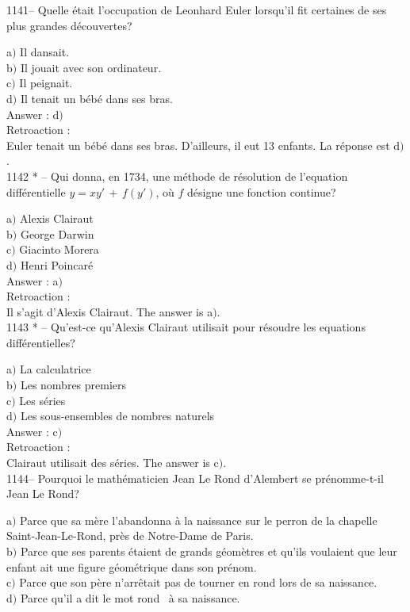 ﻿\documentclass[letterpaper, 12pt]{article}
\begin{document}
1141-- Quelle \'etait l'occupation de Leonhard Euler lorsqu'il fit
certaines de ses plus grandes d\'ecouvertes?

a$)$ Il dansait. \\
b$)$ Il jouait avec son ordinateur.  \\
c$)$ Il peignait.   \\
d$)$ Il tenait un b\'eb\'e dans ses bras.  \\

Answer : d$)$\\

Retroaction : \\
Euler tenait un b\'eb\'e dans ses bras. D'ailleurs, il eut 13 enfants. La
r\'eponse est d$)$. \\

1142 * -- Qui donna, en 1734, une m\'ethode de r\'esolution de
l'equation diff\'erentielle $y=xy'\,+\,f(y')$, o\`u $f$ d\'esigne
une fonction continue?

a$)$ Alexis Clairaut \\
b$)$ George Darwin   \\
c$)$ Giacinto Morera  \\
d$)$ Henri Poincar\'e \\

Answer : a$)$\\

Retroaction : \\
Il s'agit d'Alexis Clairaut. The answer is a$)$. \\

1143 * -- Qu'est-ce qu'Alexis Clairaut utilisait pour r\'esoudre les
equations diff\'erentielles?

a$)$ La calculatrice \\
b$)$ Les nombres premiers \\
c$)$ Les s\'eries \\
d$)$ Les sous-ensembles de nombres naturels  \\

Answer : c$)$\\

Retroaction : \\
Clairaut utilisait des s\'eries. The answer is c$)$. \\

1144-- Pourquoi le math\'ematicien Jean Le Rond d'Alembert se
pr\'enomme-t-il Jean Le Rond?

a$)$ Parce que sa m\`ere l'abandonna \`a la naissance sur le perron de la
chapelle Saint-Jean-Le-Rond, pr\`es de
Notre-Dame de Paris. \\
b$)$ Parce que ses parents \'etaient de grands g\'eom\`etres et qu'ils
voulaient que leur enfant ait une figure
g\'eom\'etrique dans son pr\'enom. \\
c$)$ Parce que son p\`ere n'arr\^etait pas de tourner en rond lors de sa
naissance.  \\
d$)$ Parce qu'il a dit le mot \og rond \fg\ \`a sa naissance.  \\
\end{document}
